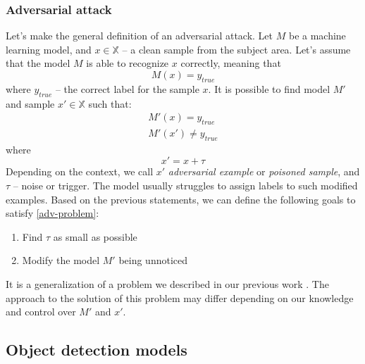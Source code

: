 \documentclass[14pt,a4paper]{extarticle}
\newcounter{e}
\numberwithin{equation}{section}
\numberwithin{figure}{section}
\begin{document}
\subsubsection{Adversarial attack}
Let's make the general definition of an adversarial attack. Let $M$ be a machine learning model, and $x \in \mathbb{X}$ -- a clean sample from the subject area. Let's assume that the model $M$ is able to recognize $x$ correctly, meaning that
\begin{equation}
M(x)=y_{true }
\end{equation}
where $y_{true }$ -- the correct label for the sample $x$. It is possible to find model $M'$ and sample $x' \in \mathbb{X}$ such that:
\begin{equation}
\label{adv-problem}
\begin{gathered}
M'\left(x\right) = y_{true} \\
M'\left(x'\right) \neq y_{true}
\end{gathered}
\end{equation}
where
\begin{equation}
x'=x+\tau
\end{equation}
Depending on the context, we call $x'$ \textit{adversarial example} or \textit{poisoned sample}, and $\tau$ -- noise or trigger. The model usually struggles to assign labels to such modified examples. Based on the previous statements, we can define the following goals to satisfy \ref{adv-problem}:
\begin{enumerate}
    \item Find $\tau$ as small as possible
    \item Modify the model $M'$ being unnoticed 
\end{enumerate}
It is a generalization of a problem we described in our previous work \cite{buhrii-1}. The approach to the solution of this problem may differ depending on our knowledge and control over $M'$ and $x'$.

\subsection{Object detection models}
\end{document}
